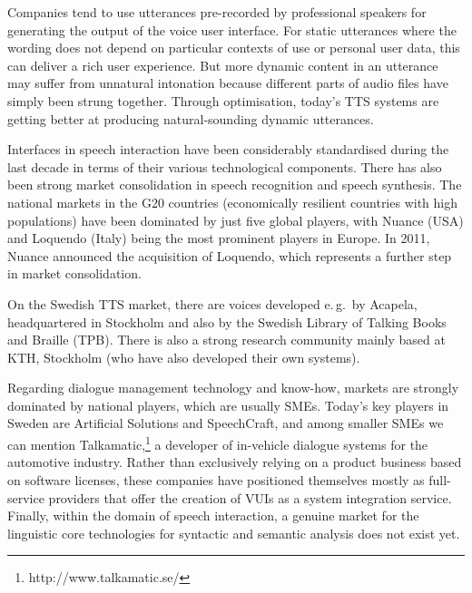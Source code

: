 \begin{multicols}{2}
Companies tend to use utterances pre-recorded by professional speakers
for generating the output of the voice user interface. For static
utterances where the wording does not depend on particular contexts of
use or personal user data, this can deliver a rich user
experience. But more dynamic content in an utterance may suffer from
unnatural intonation because different parts of audio files have simply been strung together. Through optimisation, today’s TTS systems are getting better at producing natural-sounding dynamic utterances.


Interfaces in speech interaction have been considerably standardised during the last decade in terms of their various technological components. There has also been strong market consolidation in speech recognition and speech synthesis. The national markets in the G20 countries (economically resilient countries with high populations) have been dominated by just five global players, with Nuance (USA) and Loquendo (Italy) being the most prominent players in Europe. In 2011, Nuance announced the acquisition of Loquendo, which represents a further step in market consolidation.

On the Swedish TTS market, there are voices developed e.\,g.~by Acapela, headquartered in Stockholm and also by the Swedish Library of Talking Books and Braille (TPB). There is also a strong research community mainly based at KTH, Stockholm (who have also developed their own systems).

Regarding dialogue management technology and know-how, markets are
strongly dominated by national players, which are usually
SMEs. Today’s key players in Sweden are Artificial Solutions and
SpeechCraft, and among smaller SMEs we can mention
Talkamatic,\footnote{http://www.talkamatic.se/} a developer of
in-vehicle dialogue systems for the automotive industry. Rather than
exclusively relying on a product business based on software licenses,
these companies have positioned themselves mostly as full-service
providers that offer the creation of VUIs as a system integration
service. Finally, within the domain of speech interaction, a genuine
market for the linguistic core technologies for syntactic and semantic
analysis does not exist yet.


\end{multicols}
